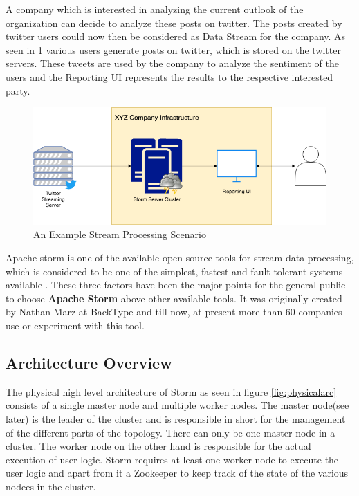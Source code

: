 \documentclass[runningheads,a4paper]{llncs}[2015/06/24]
\begin{document}
A company which is interested in analyzing the current outlook of the organization can decide to analyze these posts on twitter. The posts created by twitter users could now then be considered as Data Stream for the company. As seen in \ref{fig:example} various users generate posts on twitter, which is stored on the twitter servers. These tweets are used by the company to analyze the sentiment of the users and the Reporting UI represents the results to the respective interested party.

\begin{figure}
  \begin{center}
    \includegraphics[width=\textwidth]{example.png}
    \caption{An Example Stream Processing Scenario}
    \label{fig:example}
   \end{center}
\end{figure}

Apache storm is one of the available open source tools for stream data processing, which is considered to be one of the simplest, fastest and fault tolerant systems available \cite{stormperspective}. These three factors have been the major points for the general public to choose \textbf{Apache Storm} above other available tools. It was originally created by Nathan Marz at BackType and till now, at present more than 60 companies \cite{stormtwitter} use or experiment with this tool.

\subsection{Architecture Overview}
The physical high level architecture of Storm as seen in figure \ref{fig:physicalarc} consists of a single master node and multiple worker nodes. The master node(see later) is the leader of the cluster and is responsible in short for the management of the different parts of the topology. There can only be one master node in a cluster. The worker node on the other hand is responsible for the actual execution of user logic. Storm requires at least one worker node to execute the user logic and apart from it a Zookeeper to keep track of the state of the various nodees in the cluster.
\end{document}
